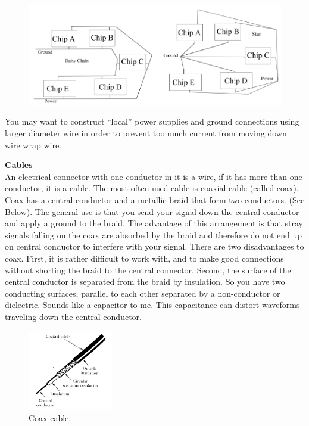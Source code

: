 \documentclass[12pt]{article}
\begin{document}
\begin{enumerate}[1.]
\begin{figure}[!ht]
\begin{center}
\includegraphics[width=\textwidth,trim=0 0 0 0,clip=false]{lab2fig2.png}
\end{center}
\end{figure}

You may want to construct ``local'' power supplies and ground connections using larger diameter wire in order to prevent too much current from moving down wire wrap wire.

{\bf Cables}\\
An electrical connector with one conductor in it is a wire, if it has more than one conductor, it is a cable. The most often used cable is coaxial cable (called coax). Coax has a central conductor and a metallic braid that form two conductors. (See Below). The general use is that you send your signal down the central conductor and apply a ground to the braid. The advantage of this arrangement is that stray signals falling on the coax are absorbed by the braid and therefore do not end up on central conductor to interfere with your signal. There are two disadvantages to coax. First, it is rather difficult to work with, and to make good connections without
shorting the braid to the central connector. Second, the surface of the central conductor is separated from the braid by insulation. So you have two conducting surfaces, parallel to each other separated by a non-conductor or dielectric. Sounds like a capacitor to me. This capacitance can distort waveforms traveling down the central conductor.

\begin{figure}[!ht]
\begin{center}
\includegraphics[width=0.33\textwidth,trim=0 0 0 0,clip=false]{lab2fig3.png}
\caption*{Coax cable.}
\end{center}
\end{figure}


\end{enumerate}
\end{document}
